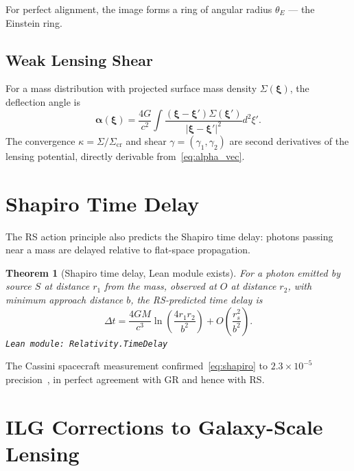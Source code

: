 \documentclass[12pt,a4paper]{article}
\newtheorem{theorem}{Theorem}[section]
\theoremstyle{definition}
\theoremstyle{remark}
\begin{document}
For perfect alignment, the image forms a ring of angular radius
$\theta_E$ — the Einstein ring.

\subsection{Weak Lensing Shear}

For a mass distribution with projected surface mass density
$\Sigma(\boldsymbol{\xi})$, the deflection angle is
\begin{equation}
  \boldsymbol{\alpha}(\boldsymbol{\xi}) = \frac{4G}{c^2}
  \int \frac{(\boldsymbol{\xi} - \boldsymbol{\xi}')
  \Sigma(\boldsymbol{\xi}')}{|\boldsymbol{\xi} - \boldsymbol{\xi}'|^2}
  d^2\xi'.
  \label{eq:alpha_vec}
\end{equation}
The convergence $\kappa = \Sigma/\Sigma_\mathrm{cr}$ and shear
$\gamma = (\gamma_1, \gamma_2)$ are second derivatives of the lensing
potential, directly derivable from~\eqref{eq:alpha_vec}.

\section{Shapiro Time Delay}
\label{sec:shapiro}

The RS action principle also predicts the Shapiro time delay: photons
passing near a mass are delayed relative to flat-space propagation.

\begin{theorem}[Shapiro time delay, Lean module exists]\label{thm:shapiro}
For a photon emitted by source $S$ at distance $r_1$ from the mass,
observed at $O$ at distance $r_2$, with minimum approach distance $b$,
the RS-predicted time delay is
\begin{equation}
  \Delta t = \frac{4GM}{c^3}\ln\left(\frac{4r_1 r_2}{b^2}\right)
             + O\!\left(\frac{r_s^2}{b^2}\right).
  \label{eq:shapiro}
\end{equation}
\texttt{Lean module: Relativity.TimeDelay}
\end{theorem}

The Cassini spacecraft measurement confirmed~\eqref{eq:shapiro} to
$2.3 \times 10^{-5}$ precision~\cite{Bertotti2003}, in perfect agreement
with GR and hence with RS.

\section{ILG Corrections to Galaxy-Scale Lensing}
\label{sec:ilg}
\end{document}
